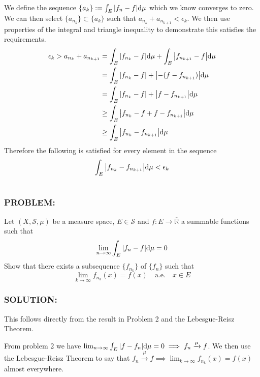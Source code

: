 \documentclass[]{article}
\newcommand{\Problem}{\subsubsection*{\textbf{PROBLEM:}}}
\newcommand{\Solution}{\subsubsection*{\textbf{SOLUTION:}}}
\newcommand{\R}{\mathbb{R}}
\newcommand{\SigAlg}{\mathcal{S}}
\begin{document}
We define the sequence $\{a_k\} := \int_{E} \abs{f_n - f} \dd \mu$ which we know converges to zero.
We can then select $\{a_{n_k}\} \subset \{a_k\}$ such that $a_{n_k} + a_{n_{k+1}} < \epsilon_k$.
We then use properties of the integral and triangle inequality to demonstrate this satisfies the requirements.
\begin{align*}
    \epsilon_k > 
    a_{n_k} + a_{n_{k+1}}
    &= \int_{E} \abs{f_{n_k} - f} \dd \mu + \int_{E} \abs{f_{n_{k+1}} - f} \dd \mu\\
    &= \int_{E} \abs{f_{n_k} - f} + \abs{-(f - f_{n_{k+1}})} \dd \mu\\
    &= \int_{E} \abs{f_{n_k} - f} + \abs{f - f_{n_{k+1}}} \dd \mu\\
    &\geq \int_{E} \abs{f_{n_k} - f + f - f_{n_{k+1}}} \dd \mu\\
    &\geq \int_{E} \abs{f_{n_k} - f_{n_{k+1}}} \dd \mu
\end{align*}
Therefore the following is satisfied for every element in the sequence\[
    \int_{E} \abs{f_{n_k} - f_{n_{k+1}}} \dd \mu < \epsilon_k
\]


\newpage
\section{}
\Problem
Let $(X, \SigAlg,\mu)$ be a measure space, $E \in \SigAlg$ and $f : E \to \overline{\R}$ a summable functions such that \[
    \lim_{n\to\infty} \int_{E} \abs{f_n - f} \dd \mu = 0
\]
Show that there exists a subsequence $\{f_{n_k}\}$ of $\{f_n\}$ such that \[
    \lim_{k\to\infty} f_{n_k}(x) = f(x) \quad \text{a.e.} \quad x \in E
\]

\Solution

This follows directly from the result in Problem 2 and the Lebesgue-Reisz Theorem.

From problem 2 we have $\lim_{n \to \infty} \int_{E} \abs{f - f_n} \dd \mu = 0 \implies f_n \xrightarrow{\mu} f$.
We then use the Lebesgue-Reisz Theorem to say that $f_n \xrightarrow{\mu} f \implies \lim_{k\to\infty} f_{n_k}(x) = f(x)$ almost everywhere.







\end{document}
